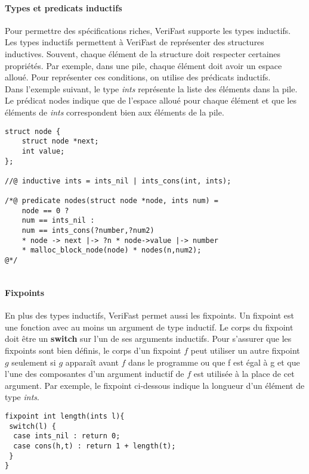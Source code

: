 \documentclass[11pt,openany]{article}
\newcommand{\verifast}{VeriFast}
\begin{document}
			\paragraph{Types et predicats inductifs}
		
				Pour permettre des sp\'ecifications riches, \verifast{} supporte les types inductifs. Les types inductifs permettent \`a \verifast{} de repr\'esenter des structures inductives. Souvent, chaque \'el\'ement de la structure doit respecter certaines propri\'et\'es. Par exemple, dans une pile, chaque \'el\'ement doit avoir un espace allou\'e.	Pour repr\'esenter ces conditions, on utilise des pr\'edicats inductifs.\\ Dans l'exemple suivant, le type \textit{ints} repr\'esente la liste des \'el\'ements dans la pile. Le pr\'edicat nodes indique que de l'espace allou\'e pour chaque \'el\'ement et que les \'el\'ements de \textit{ints} correspondent bien aux \'el\'ements de la pile. \par
			
			\begin{lstlisting}
struct node {
	struct node *next;
	int value;
};
				
//@ inductive ints = ints_nil | ints_cons(int, ints);

/*@ predicate nodes(struct node *node, ints num) =
	node == 0 ?
	num == ints_nil :
	num == ints_cons(?number,?num2) 
	* node -> next |-> ?n * node->value |-> number
	* malloc_block_node(node) * nodes(n,num2);
@*/
	
			\end{lstlisting}			
			\paragraph{Fixpoints}
				En plus des types inductifs, \verifast{} permet aussi les fixpoints. Un fixpoint est une fonction avec au moins un argument de type inductif. Le corps du fixpoint doit \^etre un \textbf{switch} sur l'un de ses arguments inductifs. Pour s'assurer que les fixpoints sont bien d\'efinis, le corps d'un fixpoint $f$ peut utiliser un autre fixpoint $g$ seulement si $g$ appara\^it avant $f$ dans le programme ou que f est \'egal \`a g et que l'une des composantes d'un argument inductif de $f$ est utilis\'ee \`a la place de cet argument. Par exemple, le fixpoint ci-dessous indique la longueur d'un \'el\'ement de type \textit{ints}.
			\begin{lstlisting}
fixpoint int length(ints l){
 switch(l) {
  case ints_nil : return 0;
  case cons(h,t) : return 1 + length(t);
 }
}
			\end{lstlisting}
\end{document}
